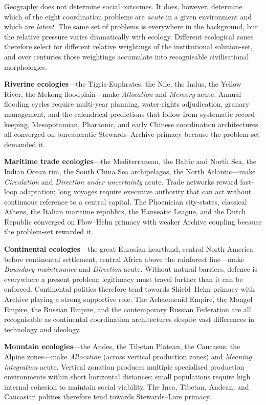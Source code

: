 \documentclass[12pt,a4paper]{article}
\begin{document}
Geography does not determine social outcomes. It does, however, determine which of the eight coordination problems are \textit{acute} in a given environment and which are \textit{latent}. The same set of problems is everywhere in the background, but the relative pressure varies dramatically with ecology. Different ecological zones therefore select for different relative weightings of the institutional solution-set, and over centuries those weightings accumulate into recognisable civilisational morphologies.

\textbf{Riverine ecologies}---the Tigris-Euphrates, the Nile, the Indus, the Yellow River, the Mekong floodplain---make \textit{Allocation} and \textit{Memory} acute. Annual flooding cycles require multi-year planning, water-rights adjudication, granary management, and the calendrical predictions that follow from systematic record-keeping. Mesopotamian, Pharaonic, and early Chinese coordination architectures all converged on bureaucratic Stewards--Archive primacy because the problem-set demanded it.

\textbf{Maritime trade ecologies}---the Mediterranean, the Baltic and North Sea, the Indian Ocean rim, the South China Sea archipelagos, the North Atlantic---make \textit{Circulation} and \textit{Direction under uncertainty} acute. Trade networks reward fast-loop adaptation; long voyages require executive authority that can act without continuous reference to a central capital. The Phoenician city-states, classical Athens, the Italian maritime republics, the Hanseatic League, and the Dutch Republic converged on Flow--Helm primacy with weaker Archive coupling because the problem-set rewarded it.

\textbf{Continental ecologies}---the great Eurasian heartland, central North America before continental settlement, central Africa above the rainforest line---make \textit{Boundary maintenance} and \textit{Direction} acute. Without natural barriers, defence is everywhere a present problem; legitimacy must travel further than it can be enforced. Continental polities therefore tend towards Shield--Helm primacy with Archive playing a strong supportive role. The Achaemenid Empire, the Mongol Empire, the Russian Empire, and the contemporary Russian Federation are all recognisable as continental coordination architectures despite vast differences in technology and ideology.

\textbf{Mountain ecologies}---the Andes, the Tibetan Plateau, the Caucasus, the Alpine zones---make \textit{Allocation} (across vertical production zones) and \textit{Meaning integration} acute. Vertical zonation produces multiple specialised production environments within short horizontal distances; small populations require high internal cohesion to maintain social viability. The Inca, Tibetan, Andean, and Caucasian polities therefore tend towards Stewards--Lore primacy.
\end{document}
